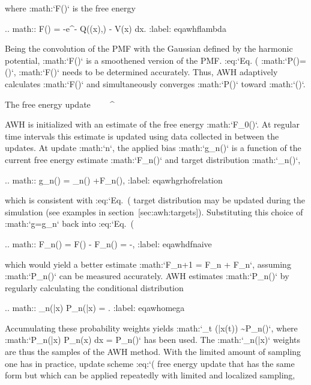 where :math:`F(\lambda)` is the free energy

.. math:: F(\lambda) = -\ln \int e^{- Q(\xi(x),\lambda) - V(x)}  dx.
          :label: eqawhflambda

Being the convolution of the PMF with the Gaussian defined by the
harmonic potential, :math:`F(\lambda)` is a smoothened version of the
PMF. :eq:`Eq. (%
:math:`P(\lambda)=\rho(\lambda)`, :math:`F(\lambda)` needs to be
determined accurately. Thus, AWH adaptively calculates
:math:`F(\lambda)` and simultaneously converges :math:`P(\lambda)`
toward :math:`\rho(\lambda)`.

The free energy update
^^^^^^^^^^^^^^^^^^^^^^

AWH is initialized with an estimate of the free energy
:math:`F_0(\lambda)`. At regular time intervals this estimate is updated
using data collected in between the updates. At update :math:`n`, the
applied bias :math:`g_n(\lambda)` is a function of the current free
energy estimate :math:`F_n(\lambda)` and target distribution
:math:`\rho_n(\lambda)`,

.. math:: g_n(\lambda) = \ln \rho_n(\lambda) +F_n(\lambda),
          :label: eqawhgrhofrelation

which is consistent with :eq:`Eq. (%
target distribution may be updated during the simulation (see examples
in section [sec:awh:targets]). Substituting this choice of :math:`g=g_n`
back into :eq:`Eq. (%

.. math:: \Delta F_n(\lambda) 
          = F(\lambda) - F_n(\lambda) 
          = -\ln{},
          :label: eqawhdfnaive

which would yield a better estimate :math:`F_{n+1} = F_n + \Delta F_n`,
assuming :math:`P_n(\lambda)` can be measured accurately. AWH estimates
:math:`P_n(\lambda)` by regularly calculating the conditional
distribution

.. math:: \omega_n(\lambda|x) \equiv P_n(\lambda|x) = .
          :label: eqawhomega

Accumulating these probability weights yields
:math:`\sum_t \omega(\lambda|x(t)) \sim P_n(\lambda)`, where
:math:`\int P_n(\lambda|x) P_n(x) dx = P_n(\lambda)` has been used. The
:math:`\omega_n(\lambda|x)` weights are thus the samples of the AWH
method. With the limited amount of sampling one has in practice, update
scheme :eq:`(%
free energy update that has the same form but which can be applied
repeatedly with limited and localized sampling,

